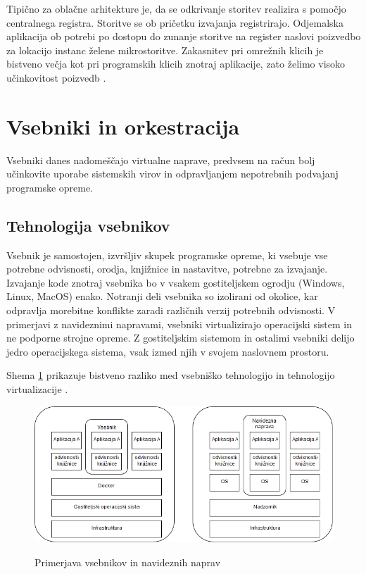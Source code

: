 \documentclass[a4paper, 12pt]{book}
\begin{document}
Tipično za oblačne arhitekture je, da se odkrivanje storitev realizira s pomočjo centralnega registra.
Storitve se ob pričetku izvajanja registrirajo.
Odjemalska aplikacija ob potrebi po dostopu do zunanje storitve na register naslovi poizvedbo za lokacijo instanc želene mikrostoritve.
Zakasnitev pri omrežnih klicih je bistveno večja kot pri programskih klicih znotraj aplikacije, zato želimo visoko učinkovitost poizvedb \cite{serviceDiscovery, maldip}.

\section{Vsebniki in orkestracija}

Vsebniki danes nadomeščajo virtualne naprave, predvsem na račun bolj učinkovite uporabe sistemskih virov in odpravljanjem nepotrebnih podvajanj programske opreme.

\subsection{Tehnologija vsebnikov}
Vsebnik je samostojen, izvršljiv skupek programske opreme, ki vsebuje vse potrebne odvisnosti, orodja, knjižnice in nastavitve, potrebne za izvajanje.
Izvajanje kode znotraj vsebnika bo v vsakem gostiteljskem ogrodju (Windows, Linux, MacOS) enako.
Notranji deli vsebnika so izolirani od okolice, kar odpravlja morebitne konflikte zaradi različnih verzij potrebnih odvisnosti.
V primerjavi z navideznimi napravami, vsebniki virtualizirajo operacijski sistem in ne podporne strojne opreme.
Z gostiteljskim sistemom in ostalimi vsebniki delijo jedro operacijskega sistema, vsak izmed njih v svojem naslovnem prostoru.

Shema \ref{vm_vs_container} prikazuje bistveno razliko med vsebniško tehnologijo in tehnologijo virtualizacije \cite{dockerContainer}.

\begin{figure}[h]
	\includegraphics[width=1.0\textwidth]{slike/vsebniki_vm.png}
	\label{vm_vs_container}
	\caption{Primerjava vsebnikov in navideznih naprav}
\end{figure}
\end{document}
